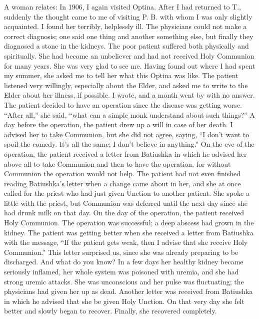 \begin{longquote}{A woman relates:}
In 1906, I again visited Optina. After I had returned to T., suddenly the thought came to me of visiting P. B. with whom I was only slightly acquainted. I found her terribly, helplessly ill. The physicians could not make a correct diagnosis; one said one thing and another something else, but finally they diagnosed a stone in the kidneys. The poor patient suffered both physically and spiritually. She had become an unbeliever and had not received Holy Communion for many years. She was very glad to see me. Having found out where I had spent my summer, she asked me to tell her what this Optina was like. The patient listened very willingly, especially about the Elder, and asked me to write to the Elder about her illness, if possible. I wrote, and a month went by with no answer. The patient decided to have an operation since the disease was getting worse. ``After all,'' she said, ``what can a simple monk understand about such things?'' A day before the operation, the patient drew up a will in case of her death. I advised her to take Communion, but she did not agree, saying, ``I don't want to spoil the comedy. It's all the same; I don't believe in anything.'' On the eve of the operation, the patient received a letter from Batiushka in which he advised her above all to take Communion and then to have the operation, for without Communion the operation would not help. The patient had not even finished reading Batiushka's letter when a change came about in her, and she at once called for the priest who had just given Unction to another patient. She spoke a little with the priest, but Communion was deferred until the next day since she had drunk milk on that day. On the day of the operation, the patient received Holy Communion. The operation was successful; a deep abscess had grown in the kidney. The patient was getting better when she received a letter from Batiushka with the message, ``If the patient gets weak, then I advise that she receive Holy Communion.'' This letter surprised us, since she was already preparing to be discharged. And what do you know? In a few days her healthy kidney became seriously inflamed, her whole system was poisoned with uremia, and she had strong uremic attacks. She was unconscious and her pulse was fluctuating; the physicians had given her up as dead. Another letter was received from Batiushka in which he advised that she be given Holy Unction. On that very day she felt better and slowly began to recover. Finally, she recovered completely.
\end{longquote}


